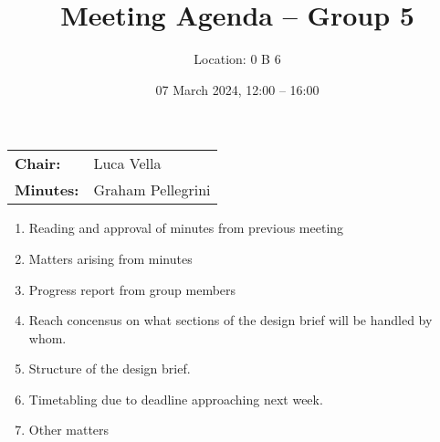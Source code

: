 \documentclass{cce2014-meetings}
\title{Meeting Agenda -- Group 5}
\author{Location: 0 B 6}
\date{07 March 2024, 12:00 -- 16:00}
\begin{document}
\maketitle
\begin{center}
\begin{tabular}{ll}
\textbf{Chair:}   & Luca Vella \\
\textbf{Minutes:} & Graham Pellegrini
\end{tabular}
\end{center}

\begin{enumerate}

\item Reading and approval of minutes from previous meeting

\item Matters arising from minutes

\item Progress report from group members

\item Reach concensus on what sections of the design brief will be handled by whom.

\item Structure of the design brief.

\item Timetabling due to deadline approaching next week.

\item Other matters

\end{enumerate}
\end{document}
